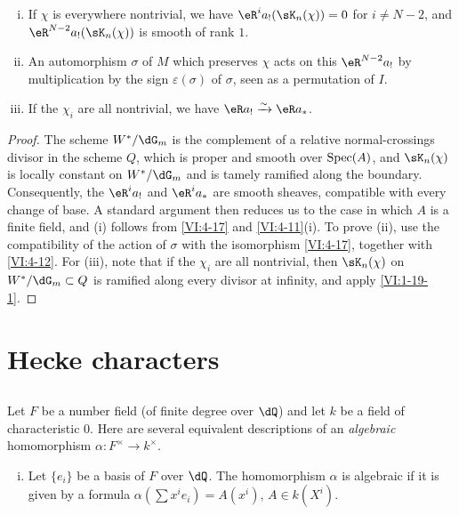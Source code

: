 \begin{proposition_}\label{VI:4-20}
\begin{enumerate}[(i)]
  \item If $\chi$ is everywhere nontrivial, we have 
    $\eR^i a_! (\sK_n(\chi)) = 0$ for $i\ne N-2$, and 
    $\eR^{N-2} a_!(\sK_n(\chi))$ is smooth of rank $1$. 
  \item An automorphism $\sigma$ of $M$ which preserves $\chi$ acts on this 
    $\eR^{N-2} a_!$ by multiplication by the sign $\varepsilon(\sigma)$ 
    of $\sigma$, seen as a permutation of $I$. 
  \item If the $\chi_i$ are all nontrivial, we have $\eR a_! \iso \eR a_\ast$. 
\end{enumerate}
\end{proposition_}
\begin{proof}[Proof]
The scheme $W^\ast/\dG_m$ is the complement of a relative normal-crossings 
divisor in the scheme $Q$, which is proper and smooth over $\operatorname{Spec}(A)$, and 
$\sK_n(\chi)$ is locally constant on $W^\ast/\dG_m$ and is tamely ramified 
along the boundary. Consequently, the $\eR^i a_!$ and 
$\eR^i a_\ast$ are smooth sheaves, compatible with every change of 
base. A standard argument then reduces us to the case in which $A$ is a 
finite field, and (i) follows from \ref{VI:4-17} and \ref{VI:4-11}(i). 
To prove (ii), use the compatibility of the action of $\sigma$ with 
the isomorphism \ref{VI:4-17}, together with \ref{VI:4-12}. For (iii), note that if the 
$\chi_i$ are all nontrivial, then $\sK_n(\chi)$ on 
$W^\ast/\dG_m\subset Q$ is ramified along every divisor at infinity, 
and apply \ref{VI:1-19-1}. 
\end{proof}










\section{Hecke characters}\label{VI:5}





\subsection{}\label{VI:5-1}

Let $F$ be a number field (of finite degree over $\dQ$) and let $k$ be a field of 
characteristic $0$. Here are several equivalent descriptions of an 
\emph{algebraic} homomorphism $\alpha:F^\times \to k^\times$. 
\begin{enumerate}[(i)]
  \item Let $\{e_i\}$ be a basis of $F$ over $\dQ$. The homomorphism $\alpha$ is 
    algebraic if it is given by a formula 
    $\alpha(\sum x^i e_i) = A(x^i)$, $A\in k(X^i)$. 
\end{enumerate}

